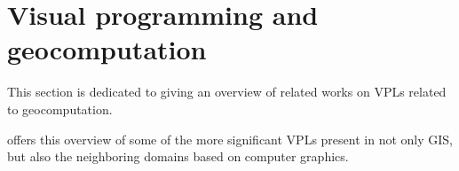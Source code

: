 

\newpage
\section{Visual programming and geocomputation}
\label{sec:related-geovpl}

This section is dedicated to giving an overview of related works on \ac{VPL}s related to geocomputation.


 offers this overview of some of the more significant \ac{VPL}s present in not only \ac{GIS}, but also the neighboring domains based on computer graphics.

